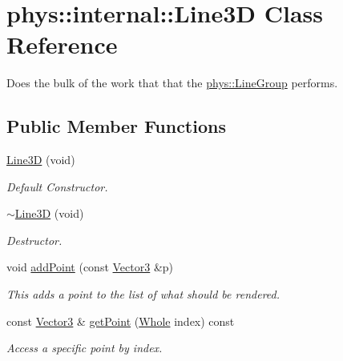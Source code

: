 \hypertarget{classphys_1_1internal_1_1Line3D}{
\section{phys::internal::Line3D Class Reference}
\label{d4/db5/classphys_1_1internal_1_1Line3D}
}


Does the bulk of the work that that the \hyperlink{classphys_1_1LineGroup}{phys::LineGroup} performs.  


\subsection*{Public Member Functions}
\begin{DoxyCompactItemize}
\item 
\hyperlink{classphys_1_1internal_1_1Line3D_ab22b8f5fae0bb2585b1031adfff424bd}{Line3D} (void)
\begin{DoxyCompactList}\small\item\em Default Constructor. \item\end{DoxyCompactList}\item 
\hyperlink{classphys_1_1internal_1_1Line3D_acddc95dd5f319d6afc68260af8bea39c}{$\sim$Line3D} (void)
\begin{DoxyCompactList}\small\item\em Destructor. \item\end{DoxyCompactList}\item 
void \hyperlink{classphys_1_1internal_1_1Line3D_aeb3b828b35b4c8ed76158285be6ddc67}{addPoint} (const \hyperlink{classphys_1_1Vector3}{Vector3} \&p)
\begin{DoxyCompactList}\small\item\em This adds a point to the list of what should be rendered. \item\end{DoxyCompactList}\item 
const \hyperlink{classphys_1_1Vector3}{Vector3} \& \hyperlink{classphys_1_1internal_1_1Line3D_a190af0e38be28297ed2f6a7aecf0c316}{getPoint} (\hyperlink{namespacephys_a460f6bc24c8dd347b05e0366ae34f34a}{Whole} index) const 
\begin{DoxyCompactList}\small\item\em Access a specific point by index. \item\end{DoxyCompactList}\item 

\end{DoxyCompactItemize}
